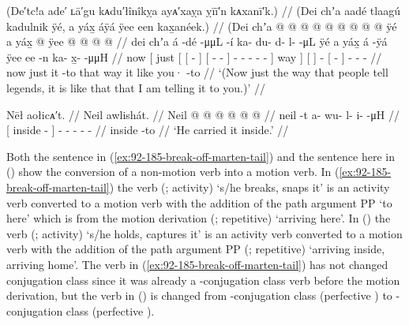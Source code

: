 \ex\label{ex:92-187-tell-you-like-they-tell-it}%
%
\begingl
	\glpreamble	(De′tc!a ade′ ʟā′gu kᴀdu′łînîkỵa ayᴀ′xaỵa ỵīī′n kᴀxanī′k.) //
	\glpreamble	(Dei chʼa aadé tlaagú kadulnik ÿé, a yáx̱ áÿá ÿee een kax̱anéek.) //
	\gla	(Dei
		{} chʼa {} {}  @ {} {} {}  @ {} @ {} {}
			 @ {} @ {} @ {} @ {} @ {} @ {} {} ÿé {}
		{} a yáx̱ {}  @ {}
		{} ÿee  @ {} {}
		 @ {} @ {} @ {} //
	\glb	\phantom{(}dei
		{} chʼa {} {} á -dé {} {}  -μμL -í {}
			ka- du- d- l-  -μL {} {} ÿé {}
		{} a yáx̱ {} á -ÿá
		{} ÿee ee -n {}
		ka- x̱-  -μμH\phantom{)} //
	\glc	\phantom{(}now
		{}[ just {}[ {}[  - {}]
			{}[  - - {}]
			- - - -  
				- \· {}] way {}]
		{}[   {}]  -
		{}[   - {}]
		- -  -\phantom{)} //
	\gld	\phantom{(}now
		{} just {} {} it -to {} {}  {} {} {}
			 {} {} {} {} {} \·that {} way {}
		{} it like {}  {}
		{} you· {} -to {}
		 {} {} {} //
	\glft	‘(Now just the way that people tell legends, it is like that that I am telling it to you.)’
		//
\endgl
\xe

\ex\label{ex:92-188-carried-inside}%
%
\begingl
	\glpreamble	Nēł aołicᴀ′t. //
	\glpreamble	Neil awlishát. //
	\gla	{} Neil @ {} {}  @ {} @ {} @ {} @ {} @ {}  //
	\glb	{} neil -t {} a- wu- l- i-  -μH //
	\glc	{}[ inside - {}]
		- - - -  - //
	\gld	{} inside -to {}  {} {} {} {} {} //
	\glft	‘He carried it inside.’
		//
\endgl
\xe

Both the sentence in (\ref{ex:92-185-break-off-marten-tail}) and the sentence here in (\lastx) show the conversion of a non-motion verb into a motion verb.
In (\ref{ex:92-185-break-off-marten-tail}) the verb  (;  activity) ‘s/he breaks, snaps it’ is an activity verb converted to a motion verb with the addition of the path argument PP  ‘to here’ which is from the motion derivation  (;  repetitive) ‘arriving here’.
In (\lastx) the verb  (;  activity) ‘s/he holds, captures it’ is an activity verb converted to a motion verb with the addition of the path argument PP  (;  repetitive) ‘arriving inside, arriving home’.
The verb in (\ref{ex:92-185-break-off-marten-tail}) has not changed conjugation class since it was already a -conjugation class verb before the motion derivation, but the verb in (\lastx) is changed from -conjugation class (perfective ) to -conjugation class (perfective ).

